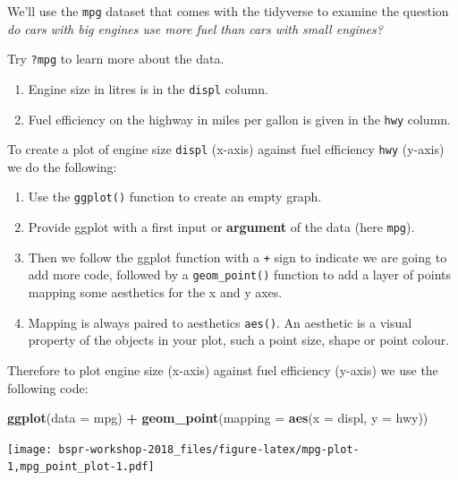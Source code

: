 \documentclass[12pt,]{book}
\newenvironment{Shaded}{\begin{snugshade}}{\end{snugshade}}
\newcommand{\KeywordTok}[1]{\textcolor[rgb]{0.13,0.29,0.53}{\textbf{#1}}}
\newcommand{\DataTypeTok}[1]{\textcolor[rgb]{0.13,0.29,0.53}{#1}}
\newcommand{\StringTok}[1]{\textcolor[rgb]{0.31,0.60,0.02}{#1}}
\newcommand{\OperatorTok}[1]{\textcolor[rgb]{0.81,0.36,0.00}{\textbf{#1}}}
\newcommand{\NormalTok}[1]{#1}
\providecommand{\tightlist}{%
  \setlength{\itemsep}{0pt}\setlength{\parskip}{0pt}}
\theoremstyle{definition}
\theoremstyle{definition}
\theoremstyle{definition}
\theoremstyle{remark}
\begin{document}
We'll use the \texttt{mpg} dataset that comes with the tidyverse to
examine the question \emph{do cars with big engines use more fuel than
cars with small engines?}

Try \texttt{?mpg} to learn more about the data.

\begin{enumerate}
\def\labelenumi{\arabic{enumi}.}
\tightlist
\item
  Engine size in litres is in the \texttt{displ} column.
\item
  Fuel efficiency on the highway in miles per gallon is given in the
  \texttt{hwy} column.
\end{enumerate}

To create a plot of engine size \texttt{displ} (x-axis) against fuel
efficiency \texttt{hwy} (y-axis) we do the following:

\begin{enumerate}
\def\labelenumi{\arabic{enumi}.}
\tightlist
\item
  Use the \texttt{ggplot()} function to create an empty graph.
\item
  Provide ggplot with a first input or \textbf{argument} of the data
  (here \texttt{mpg}).
\item
  Then we follow the ggplot function with a \texttt{+} sign to indicate
  we are going to add more code, followed by a \texttt{geom\_point()}
  function to add a layer of points mapping some aesthetics for the x
  and y axes.
\item
  Mapping is always paired to aesthetics \texttt{aes()}. An aesthetic is
  a visual property of the objects in your plot, such a point size,
  shape or point colour.
\end{enumerate}

Therefore to plot engine size (x-axis) against fuel efficiency (y-axis)
we use the following code:

\begin{Shaded}
\begin{Highlighting}[]
\KeywordTok{ggplot}\NormalTok{(}\DataTypeTok{data =}\NormalTok{ mpg) }\OperatorTok{+}\StringTok{ }
\StringTok{  }\KeywordTok{geom_point}\NormalTok{(}\DataTypeTok{mapping =} \KeywordTok{aes}\NormalTok{(}\DataTypeTok{x =}\NormalTok{ displ, }\DataTypeTok{y =}\NormalTok{ hwy))}
\end{Highlighting}
\end{Shaded}

\texttt{[image: bspr-workshop-2018\_files/figure-latex/mpg-plot-1,mpg\_point\_plot-1.pdf]}
\end{document}
